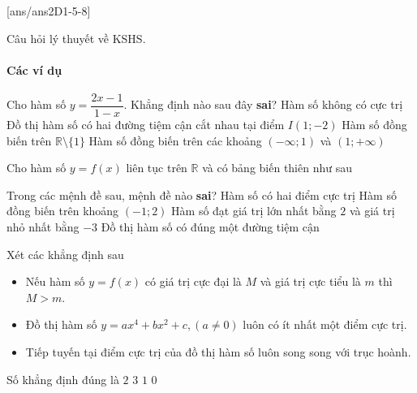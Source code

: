 [ans/ans2D1-5-8]
\begin{dang}{Câu hỏi lý thuyết về KSHS}.
\end{dang}
\paragraph{Các ví dụ}
\begin{vd}%
	Cho hàm số $y=\dfrac{2x-1}{1-x}$. Khẳng định nào sau đây \textbf{sai}?
	\choice
	{Hàm số không có cực trị}
	{Đồ thị hàm số có hai đường tiệm cận cắt nhau tại điểm $I(1;-2)$}
	{\True Hàm số đồng biến trên $\mathbb{R}\setminus \{1\}$}
	{Hàm số đồng biến trên các khoảng $(-\infty;1)$ và $(1;+\infty)$}
\end{vd}
\begin{vd}%
	Cho hàm số $y=f(x)$ liên tục trên $\mathbb{R}$ và có bảng biến thiên như sau
	\begin{center}
	\end{center}
	Trong các mệnh đề sau, mệnh đề nào \textbf{sai}?
	\choice
	{Hàm số có hai điểm cực trị}
	{Hàm số đồng biến trên khoảng $(-1;2)$}
	{\True Hàm số đạt giá trị lớn nhất bằng $2$ và giá trị nhỏ nhất bằng $-3$}
	{Đồ thị hàm số có đúng một đường tiệm cận}
\end{vd}
\begin{vd}%
	Xét các khẳng định sau
	\begin{itemize}
		\item Nếu hàm số $y=f(x)$ có giá trị cực đại là $M$ và giá trị cực tiểu là $m$ thì $M>m$.
		\item Đồ thị hàm số $y=ax^4+bx^2+c,(a\neq 0)$ luôn có ít nhất một điểm cực trị.
		\item Tiếp tuyến tại điểm cực trị của đồ thị hàm số luôn song song với trục hoành.
	\end{itemize}
	Số khẳng định đúng là 
	\choice
	{ $2$}
	{$3$}
	{\True $1$}
	{$0$}
\end{vd}
